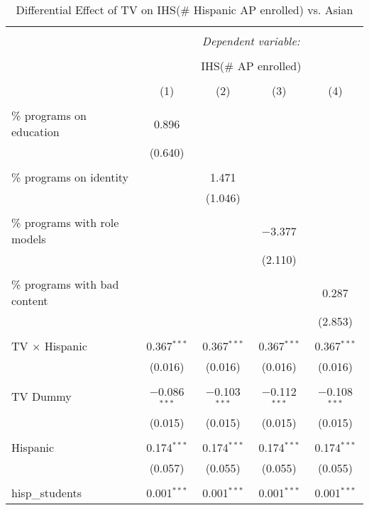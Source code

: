 
\begin{table}[!htbp] \centering 
  \caption{Differential Effect of TV on IHS(\# Hispanic AP enrolled) vs. Asian} 
  \label{} 
\begin{tabular}{@{\extracolsep{-2pt}}lcccc} 
\\[-1.8ex]\hline 
\hline \\[-1.8ex] 
 & \multicolumn{4}{c}{\textit{Dependent variable:}} \\ 
\cline{2-5} 
\\[-1.8ex] & \multicolumn{4}{c}{IHS(\# AP enrolled)} \\ 
\\[-1.8ex] & (1) & (2) & (3) & (4)\\ 
\hline \\[-1.8ex] 
 \% programs on education & 0.896 &  &  &  \\ 
  & (0.640) &  &  &  \\ 
  & & & & \\ 
 \% programs on identity &  & 1.471 &  &  \\ 
  &  & (1.046) &  &  \\ 
  & & & & \\ 
 \% programs with role models &  &  & $-$3.377 &  \\ 
  &  &  & (2.110) &  \\ 
  & & & & \\ 
 \% programs with bad content &  &  &  & 0.287 \\ 
  &  &  &  & (2.853) \\ 
  & & & & \\ 
 TV $\times$ Hispanic & 0.367$^{***}$ & 0.367$^{***}$ & 0.367$^{***}$ & 0.367$^{***}$ \\ 
  & (0.016) & (0.016) & (0.016) & (0.016) \\ 
  & & & & \\ 
 TV Dummy & $-$0.086$^{***}$ & $-$0.103$^{***}$ & $-$0.112$^{***}$ & $-$0.108$^{***}$ \\ 
  & (0.015) & (0.015) & (0.015) & (0.015) \\ 
  & & & & \\ 
 Hispanic & 0.174$^{***}$ & 0.174$^{***}$ & 0.174$^{***}$ & 0.174$^{***}$ \\ 
  & (0.057) & (0.055) & (0.055) & (0.055) \\ 
  & & & & \\ 
 hisp\_students & 0.001$^{***}$ & 0.001$^{***}$ & 0.001$^{***}$ & 0.001$^{***}$ \\ 

\end{tabular}
\end{table}
